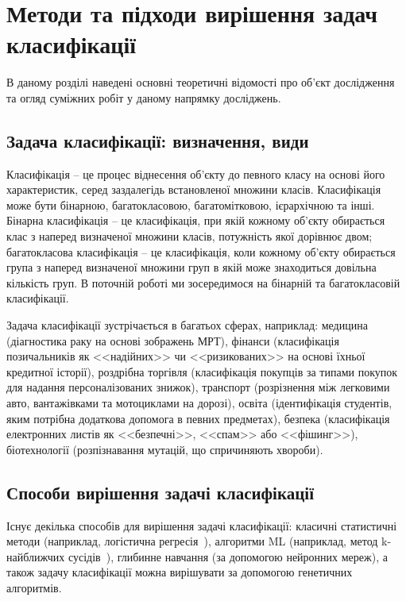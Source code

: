 
\chapter{Методи та підходи вирішення задач класифікації}
\label{chap:review}  %

В даному розділі наведені основні теоретичні відомості про об'єкт дослідження та огляд суміжних робіт у даному напрямку досліджень.

\section{Задача класифікації: визначення, види}

Класифікація -- це процес віднесення об'єкту до певного класу на основі його характеристик, серед заздалегідь встановленої множини класів. Класифікація може бути бінарною, багатокласовою, багатомітковою, ієрархічною та інші. Бінарна класифікація -- це класифікація, при якій кожному об'єкту обирається клас з наперед визначеної множини класів, потужність якої дорівнює двом; багатокласова класифікація -- це класифікація, коли кожному об'єкту обирається група з наперед визначеної множини груп в якій може знаходиться довільна кількість груп. В поточній роботі ми зосередимося на бінарній та багатокласовій класифікації.

Задача класифікації зустрічається в багатьох сферах, наприклад: медицина (діагностика раку на основі зображень МРТ), фінанси (класифікація позичальників як <<надійних>> чи <<ризикованих>> на основі їхньої кредитної історії), роздрібна торгівля (класифікація покупців за типами покупок для надання персоналізованих знижок), транспорт (розрізнення між легковими авто, вантажівками та мотоциклами на дорозі), освіта (ідентифікація студентів, яким потрібна додаткова допомога в певних предметах), безпека (класифікація електронних листів як <<безпечні>>, <<спам>> або <<фішинг>>), біотехнології (розпізнавання мутацій, що спричиняють хвороби). 

\section{Способи вирішення задачі класифікації}\label{sec:methods_of_solving_the_classification_problem}

Існує декілька способів для вирішення задачі класифікації: класичні статистичні методи (наприклад, логістична регресія~\cite{ct1}), алгоритми ML (наприклад, метод k-найближчих сусідів~\cite{ct4}), глибинне навчання (за допомогою нейронних мереж), а також задачу класифікації можна вирішувати за допомогою генетичних алгоритмів.

